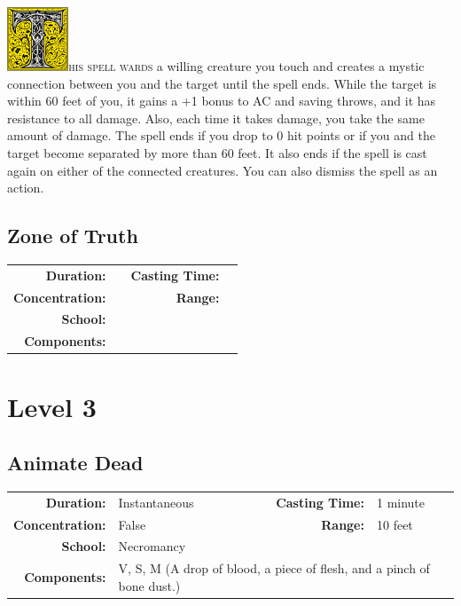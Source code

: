 \documentclass[12pt,showtrims]{memoir}
\begin{document}
\vspace{1\baselineskip}\noindent
\lettrine[lines=4]{\includegraphics[height=54pt]{initials/T.png}}{his spell wards} a willing creature you touch and creates a mystic connection between you and the target until the spell ends. While the target is within 60 feet of you, it gains a +1 bonus to AC and saving throws, and it has resistance to all damage. Also, each time it takes damage, you take the same amount of damage. The spell ends if you drop to 0 hit points or if you and the target become separated by more than 60 feet. It also ends if the spell is cast again on either of the connected creatures. You can also dismiss the spell as an action.
\newpage
\section*{Zone of Truth}
{
\small\centering\vspace{-6pt}
\begin{tabular}{rlrl}
\toprule

\textbf{Duration:} &  &
\textbf{Casting Time:} &  \\
\textbf{Concentration:} & &
\textbf{Range:} &  \\
\textbf{School:} &  \\
\textbf{Components:} & \multicolumn{3}{p{0.7\textwidth}}{}\\

\bottomrule
\end{tabular}
}
\newpage
{}
\newpage
\chapter*{Level 3} 
\section*{Animate Dead}

{
\small\centering\vspace{-6pt}
\begin{tabular}{rlrl}
\toprule

\textbf{Duration:} & Instantaneous &
\textbf{Casting Time:} & 1 minute \\
\textbf{Concentration:} & False &
\textbf{Range:} & 10 feet \\
\textbf{School:} & Necromancy \\
\textbf{Components:} & \multicolumn{3}{p{0.7\textwidth}}{V, S, M (A drop of blood, a piece of flesh, and a pinch of bone dust.)}\\

\bottomrule
\end{tabular}
}
\end{document}
